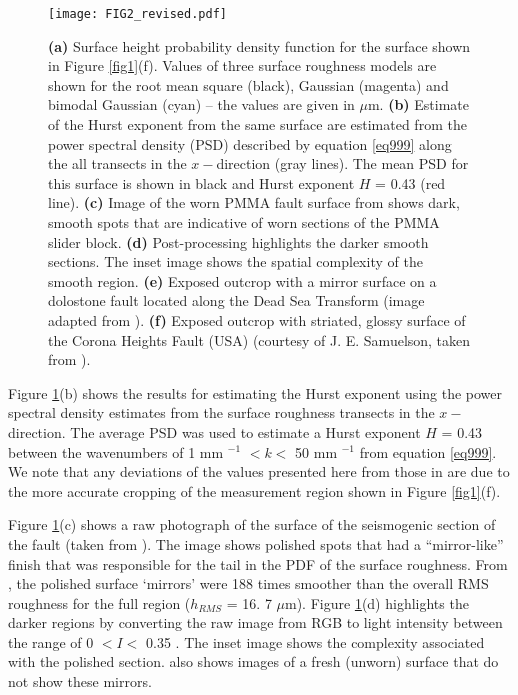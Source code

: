 \documentclass[preprint,1p, 10pt,authoryear]{elsarticle}
\begin{document}
\begin{figure}
	\centering
	\texttt{[image: FIG2\_revised.pdf]} 
	\caption{\textbf{(a)} Surface height probability density function for the surface shown in Figure \ref{fig1}(f). Values of three surface roughness models are shown for the root mean square (black), Gaussian (magenta) and bimodal Gaussian (cyan) -- the values are given in $\mu$m. \textbf{(b)} Estimate of the Hurst exponent from the same surface are estimated from the power spectral density (PSD) described by equation \eqref{eq999} along the all transects in the $x-$direction (gray lines). The mean PSD for this surface is shown in black and Hurst exponent $H$ = 0.43 (red line). \textbf{(c)} Image of the worn PMMA fault surface from \citep{Selvadurai2015b} shows dark, smooth spots that are indicative of worn sections of the PMMA slider block. \textbf{(d)} Post-processing highlights the darker smooth sections. The inset image shows the spatial complexity of the smooth region. \textbf{(e)} Exposed outcrop with a mirror surface on a dolostone fault located along the Dead Sea Transform (image adapted from \citet{Goldberg2016}).  \textbf{(f)} Exposed outcrop with striated, glossy surface of the Corona Heights Fault (USA) (courtesy of J. E. Samuelson, taken from \citet{Verberne2019}).}
	\label{fig2}
\end{figure}
Figure \ref{fig2}(b) shows the results for estimating the Hurst exponent using the power spectral density estimates from the surface roughness transects in the $x-$direction. The average PSD was used to estimate a Hurst exponent $H$ = 0.43 between the wavenumbers of 1 mm $^{-1}$  $<k<$  50 mm $^{-1}$ from equation \eqref{eq999}. We note that any deviations of the values presented here from those in \citet{Selvadurai2017} are due to the more accurate cropping of the measurement region shown in Figure \ref{fig1}(f). 

Figure \ref{fig2}(c) shows a raw photograph of the surface of the seismogenic section of the fault (taken from \citet{Selvadurai2015b}). The image shows polished spots that had a ``mirror-like'' finish that was responsible for the tail in the PDF of the surface roughness. From \citet{Selvadurai2017}, the polished surface `mirrors' were 188 times smoother than the overall RMS roughness for the full region ($h_{RMS}$ = 16. 7 $\mu$m). Figure \ref{fig2}(d) highlights the darker regions by converting the raw image from RGB to light intensity between the range of 0 $< I <$ 0.35 \citep{Gonzales2004}. The inset image shows the complexity associated with the polished section. \citet[ch. 6, ][]{Selvadurai2015b} also shows images of a fresh (unworn) surface that do not show these mirrors.
\end{document}
